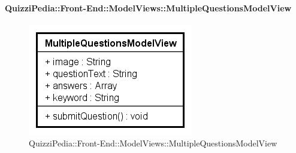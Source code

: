 \paragraph[QuizziPedia::Front-End::ModelViews\\::MultipleQuestionsModelView]{QuizziPedia::Front-End::ModelViews::MultipleQuestionsModelView}
\begin{figure} [ht]
	\centering
	\includegraphics[scale=0.80]{UML/Classi/Front-End/QuizziPedia_Front-end_ModelView_MultipleQuestionsModelView.png}
	\caption{QuizziPedia::Front-End::ModelViews::MultipleQuestionsModelView}
\end{figure} \FloatBarrier
